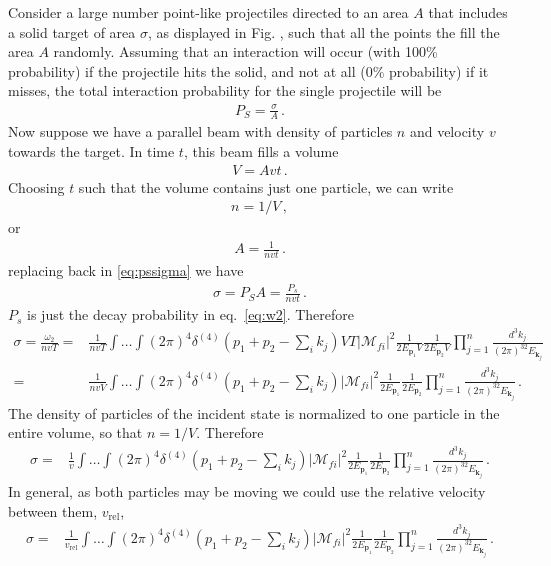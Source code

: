 Consider a large number point-like projectiles directed to an area $A$ that includes a solid target of area $\sigma$, as displayed in Fig. \label{fig:sigma}, such that all the points the fill the area $A$ randomly.
Assuming that an interaction will occur (with 100\% probability) if the projectile hits the solid, and not at all (0\% probability) if it misses, the total interaction probability for the single projectile will be
\begin{align}
  \label{eq:pssigma}
  P_S=\frac{\sigma}{A}\,.
\end{align}
Now suppose we have a parallel beam with density of particles $n$ and velocity $v$ towards the target. In time $t$, this beam fills a volume 
\begin{align}
  V=A v t\,.
\end{align}
Choosing $t$ such that the volume contains just one particle, we can write
\begin{align}
  n=1/V\,,
\end{align}
or
\begin{align}
  A=\frac{1}{n v t}\,.
\end{align}
replacing back in \eqref{eq:pssigma} we have
\begin{align}
\sigma=P_SA=\frac{P_s}{n v t}\,.  
\end{align}
$P_s$ is just the decay probability in eq.~\eqref{eq:w2}. Therefore
\begin{align}
  \sigma=\frac{\omega_2}{n v T}=&
\frac{1}{n v T}\int\ldots\int 
(2\pi)^4\delta^{(4)}\left(p_1+p_2-\sum_i k_j\right)VT 
\left|\mathcal{M}_{fi}\right|^2
\frac{1}{2E_{\mathbf{p}_1}V}\frac{1}{2E_{\mathbf{p}_2}V}
\prod_{j=1}^n\frac{d^3k_j}{(2\pi)^32E_{\mathbf{k}_j}}
\nonumber\\
=&\frac{1}{n v V}\int\ldots\int 
(2\pi)^4\delta^{(4)}\left(p_1+p_2-\sum_i k_j\right)
\left|\mathcal{M}_{fi}\right|^2
\frac{1}{2E_{\mathbf{p}_1}}\frac{1}{2E_{\mathbf{p}_2}}
\prod_{j=1}^n\frac{d^3k_j}{(2\pi)^32E_{\mathbf{k}_j}}\,.
\end{align}
The density of particles of the incident state is normalized to one particle  in the entire volume, so that $n=1/V$. Therefore
\begin{align}
   \sigma=&\frac{1}{v}\int\ldots\int 
(2\pi)^4\delta^{(4)}\left(p_1+p_2-\sum_i k_j\right)
\left|\mathcal{M}_{fi}\right|^2
\frac{1}{2E_{\mathbf{p}_1}}\frac{1}{2E_{\mathbf{p}_2}}
\prod_{j=1}^n\frac{d^3k_j}{(2\pi)^32E_{\mathbf{k}_j}}\,.
\end{align}
In general, as both particles may be moving we could use the relative velocity between them, $v_{\text{rel}}$,
\begin{align}
   \sigma=&\frac{1}{v_{\text{rel}}}\int\ldots\int 
(2\pi)^4\delta^{(4)}\left(p_1+p_2-\sum_i k_j\right)
\left|\mathcal{M}_{fi}\right|^2
\frac{1}{2E_{\mathbf{p}_1}}\frac{1}{2E_{\mathbf{p}_2}}
\prod_{j=1}^n\frac{d^3k_j}{(2\pi)^32E_{\mathbf{k}_j}}\,.
\end{align}

